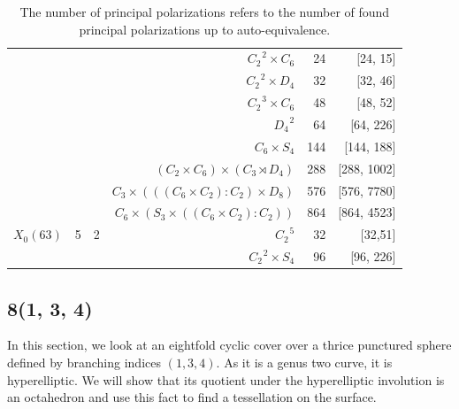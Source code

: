 \documentclass[12pt,reqno]{amsart}
\theoremstyle{definition}
\theoremstyle{remark}
\begin{document}
\begin{table}[H]
\begin{tabular}{ l | c c r r r}
& & & $C_2^{\text{ } 2} \times C_6$  & 24  & [24, 15] \\
 
& & & $C_2^{\text{ } 2} \times D_4$  & 32 & [32, 46] \\
 
& & 	& $C_2^{\text{ }3} \times C_6$ & 48 &  [48, 52] \\
 
& & & $D_4^{\text{ }2}$ & 64 & [64, 226] \\

& & & $C_6 \times S_4$ & 144 & [144, 188] \\

& & & $(C_2 \times C_6) \times (C_3 \rtimes D_4)$  & 288 & [288, 1002]  \\

& & & $C_3 \times (((C_6 \times C_2) : C_2) \times D_8)$ & 576 & [576, 7780] \\ 

& & & $C_6 \times (S_3 \times ((C_6 \times C_2) : C_2))$ & 864 & [864, 4523] \\ \hline

$X_0(63)$ & 5 & 2 & $C_2^{\text{ }5}$ & 32 & [32,51] \\
& & & $C_2 ^{\text{ }2} \times S_4$ &  96 & [96, 226] \\ \hline
\end{tabular}
\label{table:pp} 
\caption*{The number of principal polarizations refers to the number of found principal polarizations up to auto-equivalence.}
\end{table}




\subsection*{8(1, 3, 4)}

In this section, we look at an eightfold cyclic cover over a thrice punctured sphere defined by branching indices $(1, 3, 4).$ As it is a genus two curve, it is hyperelliptic. We will show that its quotient under the hyperelliptic involution is an octahedron and use this fact to find a tessellation on the surface. 
\end{document}
